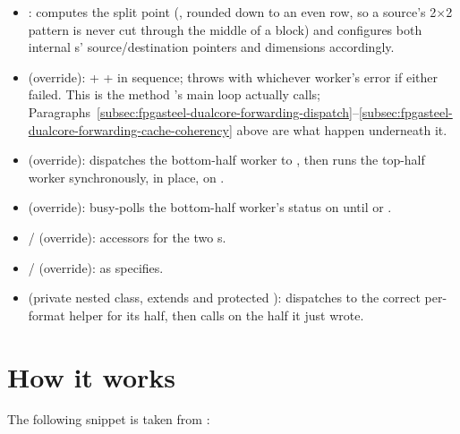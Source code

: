 \begin{itemize}
 \item {}: computes the split point (, rounded down to an even row, so a  source's 2$\times$2  pattern is never cut through the middle of a block) and configures both internal s' source/destination pointers and dimensions accordingly.
 \item {} (override):  +  +  in sequence; throws  with whichever worker's error if either failed. This is the method 's main loop actually calls; Paragraphs~\ref{subsec:fpgasteel-dualcore-forwarding-dispatch}--\ref{subsec:fpgasteel-dualcore-forwarding-cache-coherency} above are what happen underneath it.
 \item {} (override): dispatches the bottom-half worker to , then runs the top-half worker synchronously, in place, on .
 \item {} (override): busy-polls the bottom-half worker's status on  until  or .
 \item {}/ (override): accessors for the two s.
 \item {}/ (override): as  specifies.
 \item {} (private nested class, extends  and protected ):  dispatches to the correct per-format helper for its half, then calls  on the half it just wrote.
\end{itemize}

\section{How it works}
\label{sec:fpgasteel-dualcore-forwarding-how-it-works}

The following snippet is taken from :

